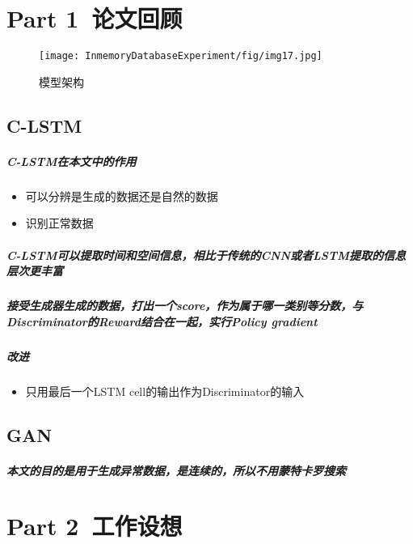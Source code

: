 \chapter{Part 1\  论文回顾}

\begin{figure}[H]
	\centering
	\texttt{[image: InmemoryDatabaseExperiment/fig/img17.jpg]}
	\caption{模型架构}
\end{figure}

\section{C-LSTM}
\paragraph{C-LSTM在本文中的作用}
\begin{itemize}
    \item 可以分辨是生成的数据还是自然的数据
    \item 识别正常数据
\end{itemize}
\paragraph{C-LSTM可以提取时间和空间信息，相比于传统的CNN或者LSTM提取的信息层次更丰富}
\paragraph{接受生成器生成的数据，打出一个score，作为属于哪一类别等分数，与Discriminator的Reward结合在一起，实行Policy gradient}
\paragraph{改进}
\begin{itemize}
    \item 只用最后一个LSTM cell的输出作为Discriminator的输入
\end{itemize}

\section{GAN}
\paragraph{本文的目的是用于生成异常数据，是连续的，所以不用蒙特卡罗搜索}




\chapter{Part 2\  工作设想}

